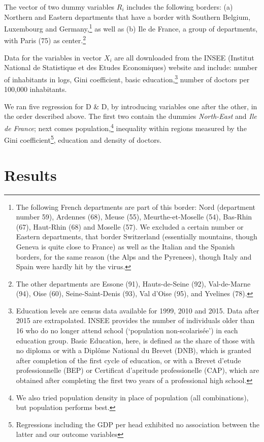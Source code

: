 \documentclass[a4paper]{article}
\theoremstyle{plain}
\theoremstyle{definition}
\begin{document}
The vector of two dummy variables $R_i$ includes the following borders: (a) Northern and
Eastern departments that have a border with Southern Belgium, Luxembourg and Germany,\footnote{The following French departments are part of this border: Nord (department number 59), Ardennes (68),
Meuse (55), Meurthe-et-Moselle (54), Bas-Rhin (67), Haut-Rhin (68) and Moselle (57). We excluded a certain number or Eastern departments, that border Switzerland (essentially mountains, though Geneva is quite close to France) as well as the Italian and the Spanish borders, for the same reason (the Alps and the Pyrenees), though Italy and Spain were hardly hit by the virus.} as well as (b) Ile de France, a group of departments, with Paris (75) as center.\footnote{The other departments are Essone (91), Hauts-de-Seine (92), Val-de-Marne (94), Oise (60), Seine-Saint-Denis (93),  Val d'Oise (95), and Yvelines (78).} 

Data for the variables in vector $X_i$ are all downloaded from the INSEE  (Institut National de Statistique et des Etudes Economiques) website and include: number of inhabitants in logs, Gini coefficient, basic education,\footnote{Education levels are census data  available for 1999, 2010 and 2015. Data after 2015 are extrapolated. INSEE provides the number of individuals older than 16 who do no longer attend school (`population non-scolaris\'ee') in each education group. Basic Education, here, is defined as the share of those with no diploma or with a Dipl\^ome National du Brevet (DNB), which is granted after completion of the first cycle of education, or with a Brevet d'etude professionnelle (BEP) or Certificat d'apritude professionelle (CAP), which are obtained after completing the first two years of a professional high school.} number of doctors per 100,000 inhabitants.

We ran five regression for D \& D, by introducing variables one after the other, in the order described above. The first two contain the dummies {\em North-East} and {\em Ile de France}; next comes population,\footnote{We also tried population density in place of population (all combinations), but population performs best.} inequality within regions measured by the Gini coefficient\footnote{Regressions including the GDP per head exhibited no association between the latter and our outcome variables},  education and density of doctors. 

\section{Results}
\end{document}
